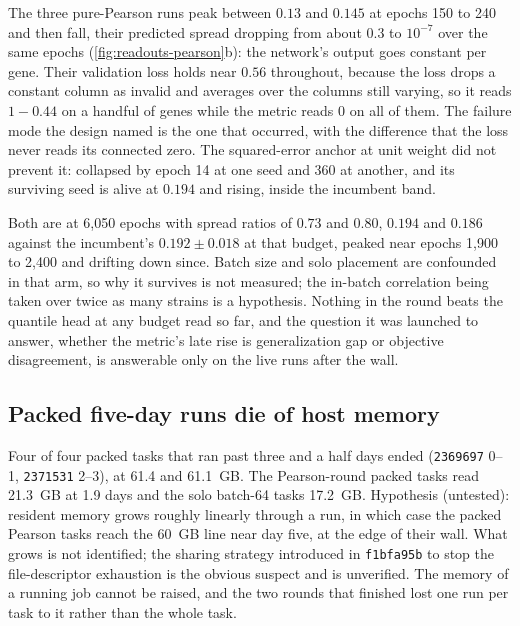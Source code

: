  The
three pure-Pearson runs peak between $0.13$ and $0.145$ at epochs 150 to 240 and then fall,
their predicted spread dropping from about $0.3$ to $10^{-7}$ over the same epochs
(\cref{fig:readouts-pearson}b): the network's output goes constant per gene. Their
validation loss holds near $0.56$ throughout, because the loss drops a constant column as
invalid and averages over the columns still varying, so it reads $1 - 0.44$ on a handful of
genes while the metric reads $0$ on all of them. The failure mode the design named is the
one that occurred, with the difference that the loss never reads its connected zero. The
squared-error anchor at unit weight did not prevent it:  collapsed by
epoch 14 at one seed and 360 at another, and its surviving seed is alive at $0.194$ and
rising, inside the incumbent band.

 Both are at 6{,}050
epochs with spread ratios of $0.73$ and $0.80$,  $0.194$ and $0.186$
against the incumbent's $0.192 \pm 0.018$ at that budget, peaked near epochs 1{,}900 to
2{,}400 and drifting down since. Batch size and solo placement are confounded in that arm,
so why it survives is not measured; the in-batch correlation being taken over twice as many
strains is a hypothesis. Nothing in the round beats the quantile head at any budget read so
far, and the question it was launched to answer, whether the metric's late rise is
generalization gap or objective disagreement, is answerable only on the live runs after the
wall.

\subsection{Packed five-day runs die of host memory}
\label{sec:readouts-oom}

Four of four packed tasks that ran past three and a half days ended 
(\texttt{2369697} 0--1, \texttt{2371531} 2--3), at  61.4 and 61.1~GB. The
Pearson-round packed tasks read 21.3~GB at 1.9 days and the solo batch-64 tasks 17.2~GB.
Hypothesis (untested): resident memory grows roughly linearly through a run, in which case
the packed Pearson tasks reach the 60~GB line near day five, at the edge of their wall. What
grows is not identified; the  sharing strategy introduced in
\texttt{f1bfa95b} to stop the file-descriptor exhaustion is the obvious suspect and is
unverified. The memory of a running job cannot be raised, and the two rounds that finished
lost one run per task to it rather than the whole task.

